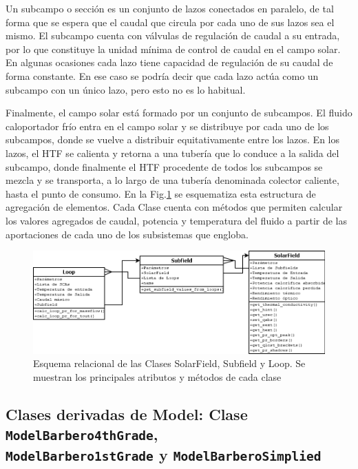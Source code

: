 Un subcampo o sección es un conjunto de lazos conectados en paralelo, de tal forma que se espera que el caudal que circula por cada uno de sus lazos sea el mismo. El subcampo cuenta con válvulas de regulación de caudal a su entrada, por lo que constituye la unidad mínima de control de caudal en el campo solar. En algunas ocasiones cada lazo tiene capacidad de regulación de su caudal de forma constante. En ese caso se podría decir que cada lazo actúa como un subcampo con un único lazo, pero esto no es lo habitual.

Finalmente, el campo solar está formado por un conjunto de subcampos. El fluido caloportador frío entra en el campo solar y se distribuye por cada uno de los subcampos, donde se vuelve a distribuir equitativamente entre los lazos. En los lazos, el HTF se calienta y retorna a una tubería que lo conduce a la salida del subcampo, donde finalmente el HTF procedente de todos los subcampos se mezcla y se transporta, a lo largo de una tubería denominada colector caliente, hasta el punto de consumo. En la Fig.\ref{fig:clasescsenergy2} se esquematiza esta estructura de agregación de elementos. Cada Clase cuenta con métodos que permiten calcular los valores agregados de caudal, potencia y temperatura del fluido a partir de las aportaciones de cada uno de los subsistemas que engloba.

\begin{figure}[H]
\includegraphics[width=0.9\linewidth]{images/clasescsenergy2.png}
\caption[Esquema relacional de las Clases SolarField, Subfield y Loop]{Esquema relacional de las Clases SolarField, Subfield y Loop. Se muestran los principales atributos y métodos de cada clase} 
\label{fig:clasescsenergy2}
\end{figure}


\subsection{Clases derivadas de Model: Clase \texttt{ModelBarbero4thGrade}, \\
\texttt{ModelBarbero1stGrade} y \texttt{ModelBarberoSimplied}}

